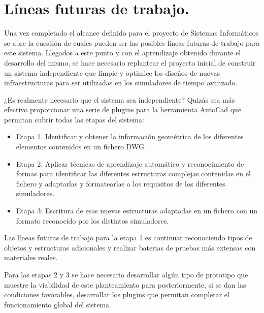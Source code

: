 \section{Líneas futuras de trabajo.}

Una vez completado el alcance definido para el proyecto de Sistemas Informáticos se abre la cuestión de cuales pueden ser las posibles líneas futuras de trabajo para este sistema. Llegados a este punto y con el aprendizaje obtenido durante el desarrollo del mismo, se hace necesario replantear el proyecto inicial de construir un sistema independiente que limpie y optimice los diseños de nuevas infraestructuras para ser utilizadas en los simuladores de tiempo avanzado. 

¿Es realmente necesario que el sistema sea independiente? Quizás sea más efectivo proporcionar una serie de plugins para la herramienta AutoCad que permitan cubrir todas las etapas del sistema:

\begin{itemize}

\item{Etapa 1. Identificar y obtener la información geométrica de los diferentes elementos contenidos en un fichero DWG.}
\item{Etapa 2. Aplicar técnicas de aprendizaje automático y reconocimiento de formas para identificar las diferentes estructuras complejas contenidas en el fichero y adaptarlas y formatearlas a los requisitos de los diferentes simuladores.}
\item{Etapa 3: Escritura de esas nuevas estructuras adaptadas en un fichero con un formato reconocido por los distintos simuladores.}

\end{itemize}

Las líneas futuras de trabajo para la etapa 1 es continuar reconociendo tipos de objetos y estructuras adicionales y realizar baterias de pruebas más extensas con materiales reales.

Para las etapas 2 y 3 se hace necesario desarrollar algún tipo de prototipo que muestre la viabilidad de este planteamiento para posteriormente, si se dan las condiciones favorables, desarrollar los plugins que permitan completar el funcionamiento global del sistema.
